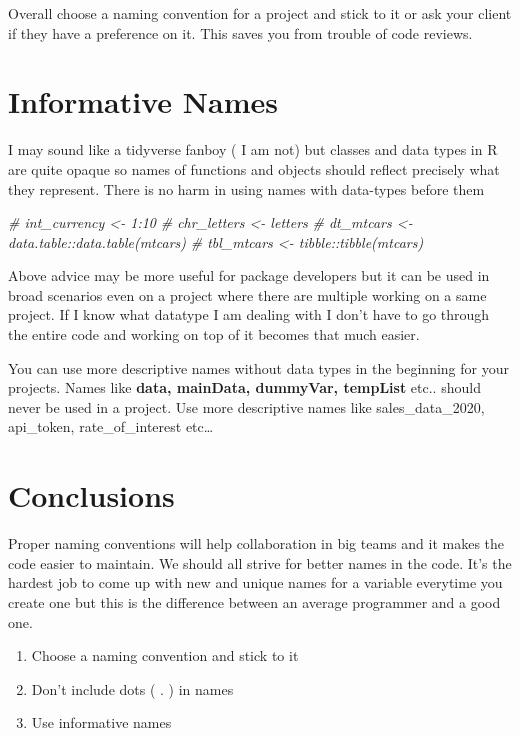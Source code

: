 \documentclass[
]{book}
\newenvironment{Shaded}{\begin{snugshade}}{\end{snugshade}}
\newcommand{\CommentTok}[1]{\textcolor[rgb]{0.56,0.35,0.01}{\textit{#1}}}
\providecommand{\tightlist}{%
  \setlength{\itemsep}{0pt}\setlength{\parskip}{0pt}}
\begin{document}
Overall choose a naming convention for a project and stick to it or ask your client if they have a preference on it. This saves you from trouble of code reviews.

\hypertarget{informative-names}{%
\section{Informative Names}\label{informative-names}}

I may sound like a tidyverse fanboy ( I am not) but classes and data types in R are quite opaque so names of functions and objects should reflect precisely what they represent. There is no harm in using names with data-types before them

\begin{Shaded}
\begin{Highlighting}[]
\CommentTok{\# int\_currency \textless{}{-} 1:10}
\CommentTok{\# chr\_letters \textless{}{-} letters}
\CommentTok{\# dt\_mtcars \textless{}{-} data.table::data.table(mtcars)}
\CommentTok{\# tbl\_mtcars \textless{}{-} tibble::tibble(mtcars)}
\end{Highlighting}
\end{Shaded}

Above advice may be more useful for package developers but it can be used in broad scenarios even on a project where there are multiple working on a same project. If I know what datatype I am dealing with I don't have to go through the entire code and working on top of it becomes that much easier.

You can use more descriptive names without data types in the beginning for your projects. Names like \textbf{data, mainData, dummyVar, tempList} etc.. should never be used in a project. Use more descriptive names like sales\_data\_2020, api\_token, rate\_of\_interest etc\ldots{}

\hypertarget{conclusions}{%
\section{Conclusions}\label{conclusions}}

Proper naming conventions will help collaboration in big teams and it makes the code easier to maintain. We should all strive for better names in the code. It's the hardest job to come up with new and unique names for a variable everytime you create one but this is the difference between an average programmer and a good one.

\begin{enumerate}
\def\labelenumi{\arabic{enumi}.}
\tightlist
\item
  Choose a naming convention and stick to it
\item
  Don't include dots ( . ) in names
\item
  Use informative names
\end{enumerate}
\end{document}
